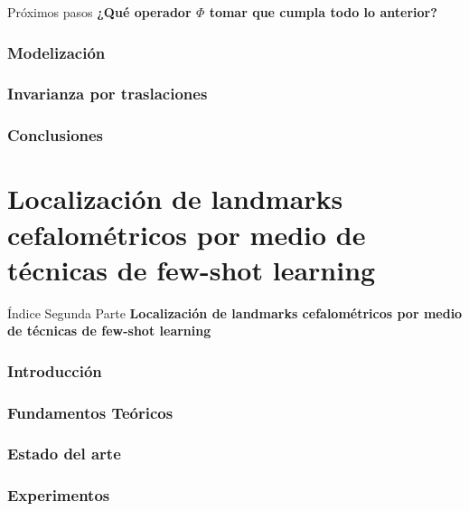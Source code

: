 \documentclass[aspectratio=43]{beamer}
\begin{document}
  \begin{frame}{Próximos pasos}
    \centering \textcolor{tudCyan}{\textbf{¿Qué operador $\Phi$ tomar que cumpla todo lo anterior?}}
  \end{frame}

\section{Modelización}

\section{Invarianza por traslaciones}

\section{Conclusiones}

\part{Localización de landmarks cefalométricos por medio de técnicas de few-shot learning}

\begin{frame}{Índice Segunda Parte}
  \textcolor{tudCyan}{\textbf{Localización de landmarks cefalométricos por medio de técnicas de few-shot learning}}
  \medskip
  \tableofcontents[part=2]
\end{frame}


\section{Introducción}

\section{Fundamentos Teóricos}

\section{Estado del arte}

\section{Experimentos}
\end{document}
